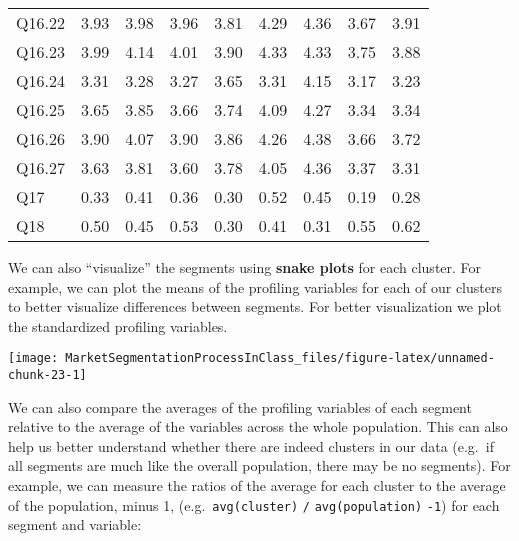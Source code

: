 \documentclass[
]{article}
\begin{document}
\begin{center}
\begin{longtable}{lrrrrrrrr}
Q16.22 & 3.93 & 3.98 & 3.96 & 3.81 & 4.29 & 4.36 & 3.67 & 3.91\\
Q16.23 & 3.99 & 4.14 & 4.01 & 3.90 & 4.33 & 4.33 & 3.75 & 3.88\\
\addlinespace
Q16.24 & 3.31 & 3.28 & 3.27 & 3.65 & 3.31 & 4.15 & 3.17 & 3.23\\
Q16.25 & 3.65 & 3.85 & 3.66 & 3.74 & 4.09 & 4.27 & 3.34 & 3.34\\
Q16.26 & 3.90 & 4.07 & 3.90 & 3.86 & 4.26 & 4.38 & 3.66 & 3.72\\
Q16.27 & 3.63 & 3.81 & 3.60 & 3.78 & 4.05 & 4.36 & 3.37 & 3.31\\
Q17 & 0.33 & 0.41 & 0.36 & 0.30 & 0.52 & 0.45 & 0.19 & 0.28\\
\addlinespace
Q18 & 0.50 & 0.45 & 0.53 & 0.30 & 0.41 & 0.31 & 0.55 & 0.62\\
\bottomrule
\end{longtable}\end{center}

We can also ``visualize'' the segments using \textbf{snake plots} for
each cluster. For example, we can plot the means of the profiling
variables for each of our clusters to better visualize differences
between segments. For better visualization we plot the standardized
profiling variables.

\begin{center}\texttt{[image: MarketSegmentationProcessInClass\_files/figure-latex/unnamed-chunk-23-1]} \end{center}

We can also compare the averages of the profiling variables of each
segment relative to the average of the variables across the whole
population. This can also help us better understand whether there are
indeed clusters in our data (e.g.~if all segments are much like the
overall population, there may be no segments). For example, we can
measure the ratios of the average for each cluster to the average of the
population, minus 1, (e.g.~\texttt{avg(cluster)} \texttt{/}
\texttt{avg(population)} \texttt{-1}) for each segment and variable:
\end{document}
